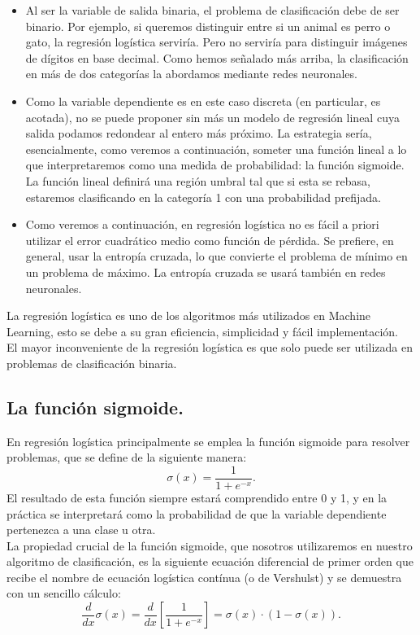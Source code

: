 \documentclass[a4paper,11pt]{article}
\begin{document}
\begin{itemize}
\item Al ser la variable de salida binaria, el problema de clasificación debe de ser binario. Por ejemplo, si queremos distinguir entre si un animal es perro o gato, la regresión logística serviría. Pero no serviría para distinguir imágenes de dígitos en base decimal. Como hemos señalado más arriba, la clasificación en más de dos categorías la abordamos mediante redes neuronales.
\item Como la variable dependiente es en este caso discreta (en particular, es acotada), no se puede proponer sin más un modelo de regresión lineal cuya salida
podamos redondear al entero más próximo. La estrategia sería, esencialmente,
como veremos a continuación, someter una función lineal a lo que interpretaremos como una medida de probabilidad: la función sigmoide. La función lineal
definirá una región umbral tal que si esta se rebasa, estaremos clasificando en la
categoría 1 con una probabilidad prefijada.

\item Como veremos a continuación, en regresión logística no es fácil a priori utilizar el error cuadrático medio como función de pérdida. Se prefiere, en general,
usar la entropía cruzada, lo que convierte el problema de mínimo en un problema
de máximo. La entropía cruzada se usará también en redes neuronales.

\end{itemize}
La regresión logística es uno de los algoritmos más utilizados en Machine Learning, esto se debe a su gran eficiencia, simplicidad y fácil implementación.\\

\noindent
El mayor inconveniente de la regresión logística es que solo puede ser utilizada en problemas de clasificación binaria.

\subsection{La función sigmoide.}
En regresión logística principalmente se emplea la función sigmoide para resolver problemas, que se define de la siguiente manera: 
\[
\sigma(x)=\frac{1}{1+e^{-x}}.
\]
El resultado de esta función siempre estará comprendido entre 0 y 1, y en la práctica se interpretará como la probabilidad de que la variable dependiente pertenezca a una clase u otra.\\

\noindent
La propiedad crucial de la función sigmoide, que nosotros utilizaremos en nuestro algoritmo de clasificación, es la siguiente ecuación diferencial de primer
orden que recibe el nombre de ecuación logística contínua (o de Vershulst) y se demuestra con un sencillo cálculo:
\[
\frac{d}{dx}\sigma(x)=\frac{d}{dx}\left[\frac{1}{1+e^{-x}}\right]=\sigma(x)\cdot(1-\sigma(x)).
\]
\end{document}
